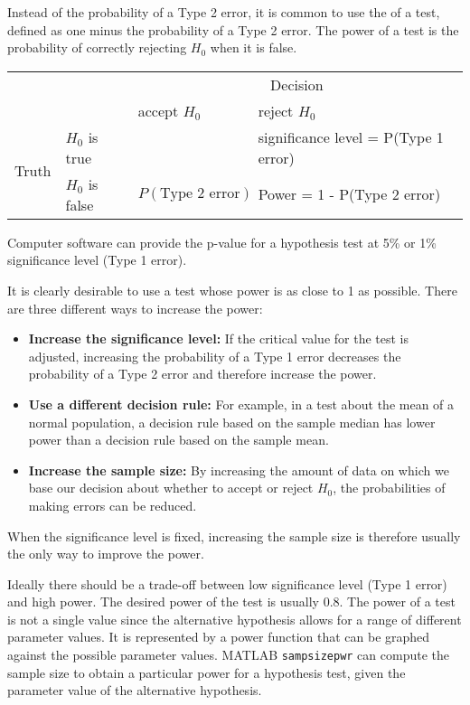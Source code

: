 Instead of the probability of a Type 2 error, it is common to use the  of a test, defined as one minus the probability of a Type 2 error. The power of a test is the probability of correctly rejecting $H_0$ when it is false.
\begin{center}
    \begin{tabular}{p{2cm}p{2cm}|p{3cm}|p{3cm}}
     & & \multicolumn{2}{|c}{Decision} \\
     \cline{3-4}
     & & accept $H_0$ & reject $H_0$ \\
     \hline
     \multirow{3}{*}{Truth} & \multicolumn{1}{|l|}{$H_0$ is true} & \cellcolor{green} & \cellcolor{red}significance level = P(Type 1 error) \\
     \cline{2-4}
     & \multicolumn{1}{|l|}{$H_0$ is false} & \cellcolor{red}$P(\text{Type 2 error})$ & \cellcolor{green}Power = 1 - P(Type 2 error) \\
\end{tabular}
\end{center}

Computer software can provide the p-value for a hypothesis test at 5\% or 1\% significance level (Type 1 error).

It is clearly desirable to use a test whose power is as close to 1 as possible. There are three different ways to increase the power:
\begin{itemize}
    \item \textbf{Increase the significance level:} If the critical value for the test is adjusted, increasing the probability of a Type 1 error decreases the probability of a Type 2 error and therefore increase the power.
    \item \textbf{Use a different decision rule:} For example, in a test about the mean of a normal population, a decision rule based on the sample median has lower power than a decision rule based on the sample mean.
    \item \textbf{Increase the sample size:} By increasing the amount of data on which we base our decision about whether to accept or reject $H_0$, the probabilities of making errors can be reduced.
\end{itemize}

When the significance level is fixed, increasing the sample size is therefore usually the only way to improve the power.

Ideally there should be a trade-off between low significance level (Type 1 error) and high power. The desired power of the test is usually 0.8. The power of a test is not a single value since the alternative hypothesis allows for a range of different parameter values. It is represented by a power function that can be graphed against the possible parameter values. MATLAB \texttt{sampsizepwr} can compute the sample size to obtain a particular power for a hypothesis test, given the parameter value of the alternative hypothesis.

